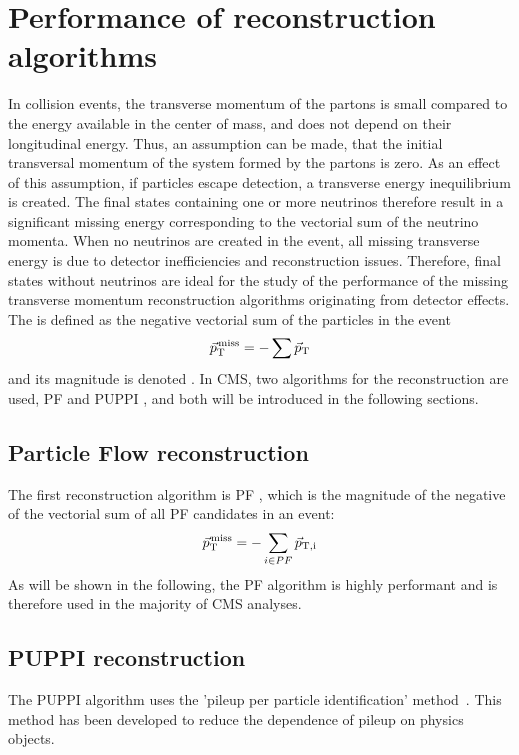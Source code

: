 \section{Performance of \ptmiss reconstruction algorithms}
\noindent\justify
In collision events, the transverse momentum of the partons is small compared to the energy available in the center of mass, and does not depend on their longitudinal energy. 
Thus, an assumption can be made, that the initial transversal momentum of the system formed by the partons is zero. 
As an effect of this assumption, if particles escape detection, a transverse energy inequilibrium is created. 
The final states containing one or more neutrinos therefore result in a significant missing energy corresponding to the vectorial sum of the neutrino momenta. 
When no neutrinos are created in the event, all missing transverse energy is due to detector inefficiencies and reconstruction issues. 
Therefore, final states without neutrinos are ideal for the study of the performance of the missing transverse momentum reconstruction algorithms originating from detector effects.
The \ptmiss is defined as the negative vectorial sum of the particles in the event
\begin{equation}
{\vec p}_{\mathrm{T}}^{\kern1pt\text{miss}} =- \sum \vec{p}_{\mathrm{T}}
\end{equation}                                                                      
and its magnitude is denoted \ptmiss. 
In CMS, two algorithms for the \ptmiss reconstruction are used, PF \ptmiss and PUPPI \ptmiss, and both will be introduced in the following sections. 
\subsection*{Particle Flow \ptmiss reconstruction}
\noindent
\justify
The first reconstruction algorithm is PF \ptmiss, which is the magnitude of the negative of the vectorial sum of all PF candidates in an event:
\begin{equation}
{\vec p}_{\mathrm{T}}^{\kern1pt\text{miss}} =- \sum_{i\in PF} \vec{p}_{\mathrm{T, i}}
\label{eq:MET}
\end{equation}                                                                      
As will be shown in the following, the PF \ptmiss algorithm is highly performant and is therefore used in the majority of CMS analyses.
\subsection*{PUPPI \ptmiss reconstruction}
\noindent
\justify
The PUPPI \ptmiss algorithm uses the 'pileup per particle identification' method~\cite{Bertolini:2014bba}. This method has been developed to reduce the dependence of pileup on physics objects. 
